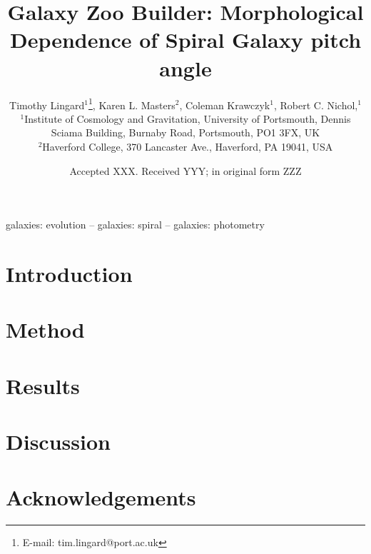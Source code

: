 \documentclass[fleqn,usenatbib]{mnras}
\title[Galaxy Zoo Builder: Morphological Dependence of Spiral galaxy pitch angle]{Galaxy Zoo Builder: Morphological Dependence of Spiral Galaxy pitch angle}
\author[T. Lingard et al.]{
  Timothy Lingard$^{1}$\thanks{E-mail: tim.lingard@port.ac.uk},
  Karen L. Masters$^{2}$,
  Coleman Krawczyk$^{1}$,
  Robert C. Nichol,$^{1}$
  \\
  $^{1}$Institute of Cosmology and Gravitation, University of Portsmouth, Dennis Sciama Building, Burnaby Road, Portsmouth, PO1 3FX, UK\\
  $^{2}$Haverford College, 370 Lancaster Ave., Haverford, PA 19041, USA\\
}
\date{Accepted XXX. Received YYY; in original form ZZZ}
\begin{document}
\label{firstpage}
\pagerange{\pageref{firstpage}--\pageref{lastpage}}
\maketitle

\begin{abstract}

\end{abstract}

\begin{keywords}
galaxies: evolution -- galaxies: spiral -- galaxies: photometry
\end{keywords}



% 

\section{Introduction}


\section{Method}


\section{Results}


\section{Discussion}


\section{Acknowledgements}


\end{document}
